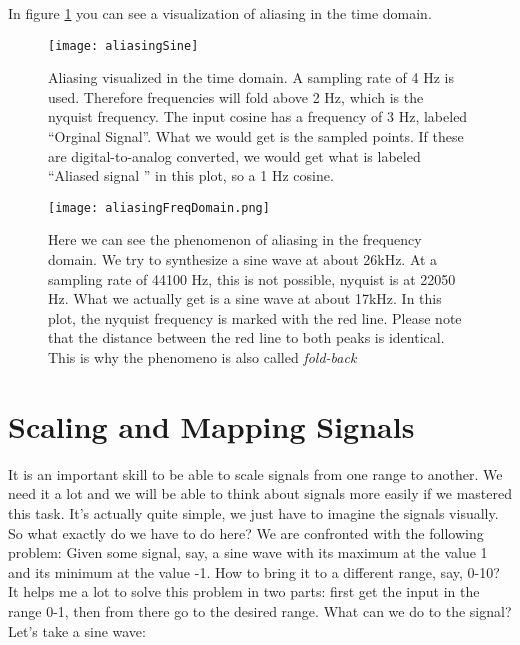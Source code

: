 In figure \ref{fig:cosAlias} you can see a visualization of aliasing in the time domain.

\begin{figure}[H]
	\centering
	\texttt{[image: aliasingSine]}
	\caption[shortCaption]
	{Aliasing visualized in the time domain. A sampling rate of 4 Hz is used. Therefore frequencies will fold above 2 Hz, which is the nyquist frequency. The input cosine has a frequency of 3 Hz, labeled ``Orginal Signal''. What we would get is the sampled points. If these are digital-to-analog converted, we would get what is labeled ``Aliased signal '' in this plot, so a 1 Hz cosine.}
	\label{fig:cosAlias}
\end{figure}



\begin{figure}[H]
	\begin{center}
		\texttt{[image: aliasingFreqDomain.png]}
		\caption[Aliasing in the Frequency Domain]
		{Here we can see the phenomenon of aliasing in the frequency domain. We try to synthesize a sine wave at about 26kHz. At a sampling rate of 44100 Hz, this is not possible, nyquist is at 22050 Hz. What we actually get is a sine wave at about 17kHz. In this plot, the nyquist frequency is marked with the red line. Please note that the distance between the red line to both peaks is identical. This is why the phenomeno is also called \textit{fold-back}}
		\label{fig:name}
	\end{center}
\end{figure}





\section{Scaling and Mapping Signals}
It is an important skill to be able to scale signals from one range to another. We need it a lot and we will be able to think about signals more easily if we mastered this task. It's actually quite simple, we just have to imagine the signals visually.\\
So what exactly do we have to do here? We are confronted with the following problem: Given some signal, say, a sine wave with its maximum at the value 1 and its minimum at the value -1. How to bring it to a different range, say, 0-10?\\
It helps me a lot to solve this problem in two parts: first get the input in the range 0-1, then from there go to the desired range. What can we do to the signal? Let's take a sine wave:

